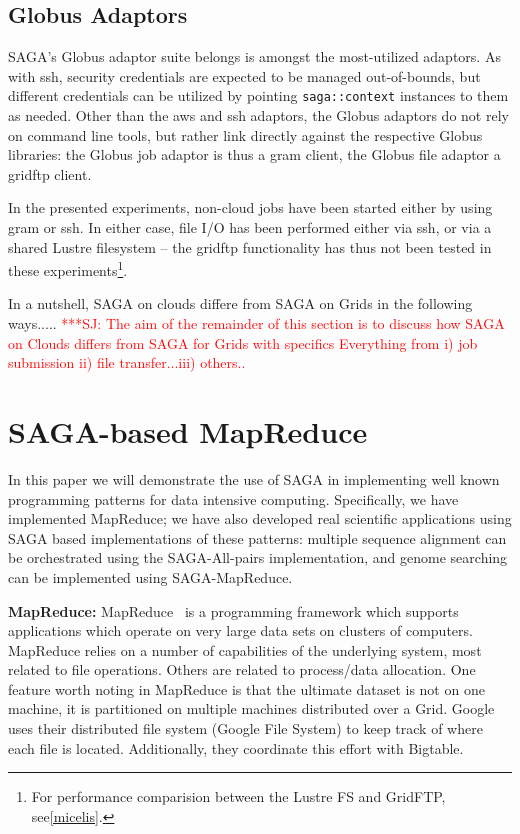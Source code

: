 \documentclass[conference,final]{IEEEtran}
\newcommand{\jhanote}[1]{ {\textcolor{red} { ***SJ: #1 }}}
\newcommand{\jhanote}[1]{}
\newcommand{\T}[1]{\texttt{#1}}
\begin{document}
 \subsection{Globus Adaptors}

  SAGA's Globus adaptor suite belongs is amongst the most-utilized
  adaptors.  As with ssh, security credentials are expected to be
  managed out-of-bounds, but different credentials can be utilized by
  pointing \T{saga::context} instances to them as needed.  Other than
  the aws and ssh adaptors, the Globus adaptors do not rely on command
  line tools, but rather link directly against the respective Globus
  libraries: the Globus job adaptor is thus a gram client, the Globus
  file adaptor a gridftp client.

  In the presented experiments, non-cloud jobs have been started
  either by using gram or ssh.  In either case, file I/O has been
  performed either via ssh, or via a shared Lustre filesystem -- the
  gridftp functionality has thus not been tested in these
  experiments\footnote{For performance comparision between the Lustre
    FS and GridFTP, see\ref{micelis}.}.


In a nutshell, SAGA on clouds differe from SAGA on Grids in the
following ways.....  \jhanote{The aim of the remainder of this section
  is to discuss how SAGA on Clouds differs from SAGA for Grids with
  specifics Everything from i) job submission ii) file transfer...iii)
  others..}

\section{SAGA-based MapReduce}

In this paper we will demonstrate the use of SAGA in implementing well
known programming patterns for data intensive computing.
Specifically, we have implemented MapReduce; we have also developed
real scientific applications using SAGA based implementations of these
patterns: multiple sequence alignment can be orchestrated using the
SAGA-All-pairs implementation, and genome searching can be implemented
using SAGA-MapReduce.

{\bf MapReduce:} MapReduce~\cite{mapreduce-paper} is a programming
framework which supports applications which operate on very large data
sets on clusters of computers.  MapReduce relies on a number of
capabilities of the underlying system, most related to file
operations.  Others are related to process/data
allocation. %
One feature worth noting in MapReduce is that the ultimate dataset is
not on one machine, it is partitioned on multiple machines distributed
over a Grid. Google uses their distributed file system (Google File
System) to keep track of where each file is located.  Additionally,
they coordinate this effort with Bigtable.
\end{document}
